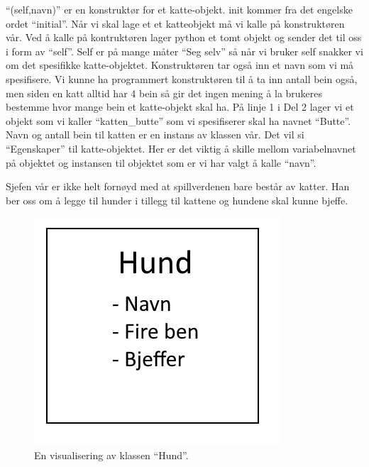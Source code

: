 ``\twound{\text{ }}(self,navn)'' er en konstruktør for et katte-objekt. init kommer fra det engelske ordet ``initial''. Når vi skal lage et et katteobjekt må vi kalle på konstruktøren vår. Ved å kalle på kontruktøren lager python et tomt objekt og sender det til oss i form av ``self''. Self er på mange måter ``Seg selv'' så når vi bruker self snakker vi om det spesifikke katte-objektet. Konstruktøren tar også inn et navn som vi må spesifisere. Vi kunne ha programmert konstruktøren til å ta inn antall bein også, men siden en katt alltid har 4 bein så gir det ingen mening å la brukeres bestemme hvor mange bein et katte-objekt skal ha. På linje 1 i Del 2 lager vi et objekt som vi kaller ``katten\_butte'' som vi spesifiserer skal ha navnet ``Butte''. Navn og antall bein til katten er en instans av klassen vår. Det vil si ``Egenskaper'' til katte-objektet. Her er det viktig å skille mellom variabelnavnet på objektet og instansen til objektet som er vi har valgt å kalle ``navn''.

Sjefen vår er ikke helt fornøyd med at spillverdenen bare består av katter. Han ber oss om å legge til hunder i tillegg til kattene og hundene skal kunne bjeffe.

\begin{figure}[H]
    \centering
    \includegraphics[scale=0.5]{Figures/Klasser_hund.png}
    \caption{En visualisering av klassen ``Hund''.}
    \label{fig:klasse_hund}
\end{figure}

